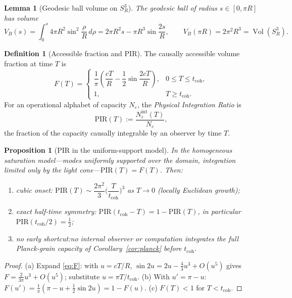 \documentclass[11pt,a4paper]{article}
\newtheorem{proposition}[theorem]{Proposition}
\newtheorem{lemma}[theorem]{Lemma}
\theoremstyle{definition}
\newtheorem{definition}[theorem]{Definition}
\theoremstyle{remark}
\newcommand{\Sthree}{S^{3}}
\newcommand{\PIR}{\mathrm{PIR}}
\newcommand{\tcoh}{t_{\mathrm{coh}}}
\begin{document}
\begin{lemma}[Geodesic ball volume on $\Sthree_{R}$]
\label{lem:ball}
The geodesic ball of radius $s\in[0,\pi R]$ has volume
\begin{equation}
V_{B}(s)=\int_{0}^{s}4\pi R^{2}\sin^{2}\!\frac{\rho}{R}\,d\rho
=2\pi R^{2}s-\pi R^{3}\sin\frac{2s}{R},
\qquad V_{B}(\pi R)=2\pi^{2}R^{3}=\operatorname{Vol}(\Sthree_{R}).
\end{equation}
\end{lemma}

\begin{definition}[Accessible fraction and PIR]
\label{def:pir}
The causally accessible volume fraction at time $T$ is
\begin{equation}
F(T)=
\begin{cases}
\dfrac{1}{\pi}\left(\dfrac{cT}{R}-\dfrac12\sin\dfrac{2cT}{R}\right), & 0\le T\le\tcoh,\\[1.4ex]
1, & T\ge\tcoh .
\end{cases}
\label{eq:F}
\end{equation}
For an operational alphabet of capacity $N_{\varepsilon}$, the \emph{Physical Integration
Ratio} is
\begin{equation}
\PIR(T):=\frac{N^{\mathrm{int}}_{\varepsilon}(T)}{N_{\varepsilon}},
\end{equation}
the fraction of the capacity causally integrable by an observer by time $T$.
\end{definition}

\begin{proposition}[PIR in the uniform-support model]
\label{prop:pir}
In the homogeneous saturation model---modes uniformly supported over the domain, integration
limited only by the light cone---$\PIR(T)=F(T)$.  Then:
\begin{enumerate}[label=(\alph*)]
\item \emph{cubic onset:}\quad
$\PIR(T)\sim\dfrac{2\pi^{2}}{3}\Big(\dfrac{T}{\tcoh}\Big)^{3}$ as $T\to0$
(locally Euclidean growth);
\item \emph{exact half-time symmetry:}\quad
$\PIR(\tcoh-T)=1-\PIR(T)$, in particular $\PIR(\tcoh/2)=\tfrac12$;
\item \emph{no early shortcut:}\quad no internal observer or computation integrates the full
Planck-grain capacity of Corollary~\ref{cor:planck} before $\tcoh$.
\end{enumerate}
\end{proposition}

\begin{proof}
(a) Expand \eqref{eq:F}: with $u=cT/R$, $\sin2u=2u-\tfrac43u^{3}+O(u^{5})$ gives
$F=\tfrac{2}{3\pi}u^{3}+O(u^{5})$; substitute $u=\pi T/\tcoh$.
(b) With $u'=\pi-u$: $F(u')=\tfrac1\pi(\pi-u+\tfrac12\sin2u)=1-F(u)$.
(c) $F(T)<1$ for $T<\tcoh$.

\end{proof}
\end{document}
